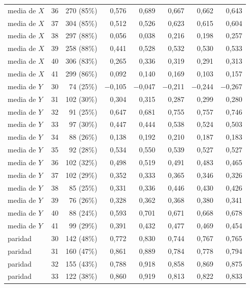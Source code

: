 \begin{table}[htbp]
{\begin{tabular}{@{}lrrrrrrr@{}}
        media de $X$ & 36 & 270 (85\%) & 0,576 & 0,689 & 0,667 & 0,662 & 0,643 \\
        media de $X$ & 37 & 304 (85\%) & 0,512 & 0,526 & 0,623 & 0,615 & 0,604 \\
        media de $X$ & 38 & 297 (88\%) & 0,056 & 0,038 & 0,216 & 0,198 & 0,257 \\
        media de $X$ & 39 & 258 (88\%) & 0,441 & 0,528 & 0,532 & 0,530 & 0,533 \\
        media de $X$ & 40 & 306 (83\%) & 0,265 & 0,336 & 0,319 & 0,291 & 0,313 \\
        media de $X$ & 41 & 299 (86\%) & 0,092 & 0,140 & 0,169 & 0,103 & 0,157 \\
        media de $Y$ & 30 & 74 (25\%) & $-$0,105 & $-$0,047 & $-$0,211 & $-$0,244 & $-$0,267 \\
        media de $Y$ & 31 & 102 (30\%) & 0,304 & 0,315 & 0,287 & 0,299 & 0,280 \\
        media de $Y$ & 32 & 91 (25\%) & 0,647 & 0,681 & 0,755 & 0,757 & 0,746 \\
        media de $Y$ & 33 & 97 (30\%) & 0,447 & 0,444 & 0,538 & 0,524 & 0,503 \\
        media de $Y$ & 34 & 88 (26\%) & 0,138 & 0,192 & 0,210 & 0,187 & 0,183 \\
        media de $Y$ & 35 & 92 (28\%) & 0,534 & 0,550 & 0,539 & 0,527 & 0,527 \\
        media de $Y$ & 36 & 102 (32\%) & 0,498 & 0,519 & 0,491 & 0,483 & 0,465 \\
        media de $Y$ & 37 & 102 (29\%) & 0,352 & 0,333 & 0,365 & 0,346 & 0,326 \\
        media de $Y$ & 38 & 85 (25\%) & 0,331 & 0,336 & 0,446 & 0,430 & 0,426 \\
        media de $Y$ & 39 & 76 (26\%) & 0,328 & 0,362 & 0,368 & 0,380 & 0,341 \\
        media de $Y$ & 40 & 88 (24\%) & 0,593 & 0,701 & 0,671 & 0,668 & 0,678 \\
        media de $Y$ & 41 & 99 (29\%) & 0,391 & 0,432 & 0,477 & 0,469 & 0,454 \\
        paridad & 30 & 142 (48\%) & 0,772 & 0,830 & 0,744 & 0,767 & 0,765 \\
        paridad & 31 & 160 (47\%) & 0,861 & 0,889 & 0,784 & 0,778 & 0,794 \\
        paridad & 32 & 155 (43\%) & 0,788 & 0,918 & 0,858 & 0,869 & 0,875 \\
        paridad & 33 & 122 (38\%) & 0,860 & 0,919 & 0,813 & 0,822 & 0,833 \\

\end{tabular}}
\end{table}
